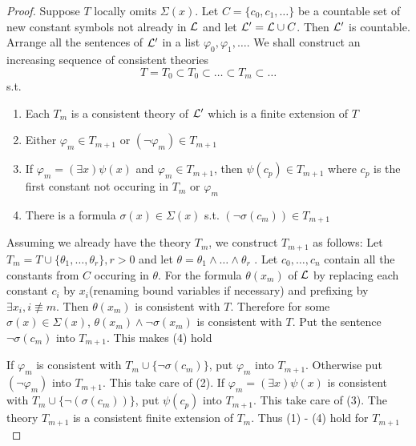 \documentclass[11pt]{article}
\begin{document}
\begin{proof}
Suppose \(T\) locally omits \(\Sigma(x)\). Let \(C=\{c_0,c_1,\dots\}\) be a
countable set of new constant symbols not already in \(\mathcal{L}\) and let
\(\mathcal{L}'=\mathcal{L}\cup C\). Then \(\mathcal{L}'\) is countable. Arrange all the
sentences of \(\mathcal{L}'\) in a list \(\varphi_0,\varphi_1,\dots\). We shall
construct an increasing sequence of consistent theories
\begin{equation*}
T=T_0\subset T_0\subset\dots\subset T_m\subset\dots
\end{equation*}
s.t.
\begin{enumerate}
\item Each \(T_m\) is a consistent theory of \(\mathcal{L}'\) which is a finite
extension of \(T\)
\item Either \(\varphi_m\in T_{m+1}\) or \((\neg\varphi_m)\in T_{m+1}\)
\item If \(\varphi_m=(\exists x)\psi(x)\) and \(\varphi_m\in T_{m+1}\), then
\(\psi(c_p)\in T_{m+1}\) where \(c_p\) is the first constant not occuring in
\(T_m\) or \(\varphi_m\)
\item There is a formula \(\sigma(x)\in\Sigma(x)\) s.t. \((\neg\sigma(c_m))\in
      T_{m+1}\)
\end{enumerate}


Assuming we already have the theory \(T_m\), we construct \(T_{m+1}\) as
follows: Let \(T_m=T\cup\{\theta_1,\dots,\theta_r\},r>0\) and let
\(\theta=\theta_1\wedge\dots\wedge\theta_r\) . Let \(c_0,\dots,c_n\) contain
all the constants from \(C\) occuring in \(\theta\). For the formula \(\theta(x_m)\) of
\(\mathcal{L}\) by replacing each constant \(c_i\) by \(x_i\)(renaming bound
variables if necessary) and prefixing by \(\exists x_i,i\not\equiv m\). Then
\(\theta(x_m)\) is consistent with \(T\). Therefore for some \(\sigma(x)\in\Sigma(x)\),
\(\theta(x_m)\wedge\neg\sigma(x_m)\) is consistent with \(T\). Put the sentence
\(\neg\sigma(c_m)\) into \(T_{m+1}\). This makes (4) hold

If \(\varphi_m\) is consistent with \(T_m\cup\{\neg\sigma(c_m)\}\), put
\(\varphi_m\) into \(T_{m+1}\). Otherwise put \((\neg\varphi_m)\) into
\(T_{m+1}\). This take care of (2). If \(\varphi_m=(\exists x)\psi(x)\) is
consistent with \(T_m\cup\{\neg(\sigma(c_m))\}\), put \(\psi(c_p)\) into \(T_{m+1}\).
This take care of (3). The theory \(T_{m+1}\) is a consistent finite
extension of \(T_m\). Thus (1) - (4) hold for \(T_{m+1}\)


\end{proof}
\end{document}
